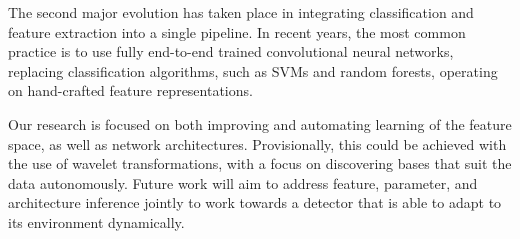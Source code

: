 \documentclass[12pt]{llncs}
\begin{document}
The second major evolution has taken place in integrating classification and feature extraction into a single pipeline. In recent years, the most common practice is to use fully end-to-end trained convolutional neural networks, replacing classification algorithms, such as SVMs and random forests, operating on hand-crafted feature representations. 

Our research is focused on both improving and automating learning of the feature space, as well as network architectures. Provisionally, this could be achieved with the use of wavelet transformations, with a focus on discovering bases that suit the data autonomously. Future work will aim to address feature, parameter, and architecture inference jointly to work towards a detector that is able to adapt to its environment dynamically.



\end{document}
